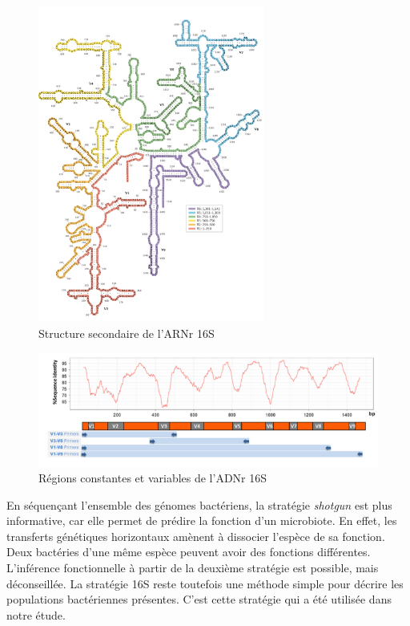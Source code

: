 \documentclass[12pt,a4paper]{article}
\begin{document}
\begin{figure}[ht]
\begin{center}
\includegraphics[scale=0.8]{img/ARN_16S.png}\hfill
\end{center}
\caption{Structure secondaire de l'ARNr 16S}
\label{ARN16S}
\end{figure}

\begin{figure}[ht]
\begin{center}
\includegraphics[scale=0.8]{img/ARN16S_variation.png}\hfill
\end{center}
\caption{Régions constantes et variables de l'ADNr 16S}
\label{ARN16SVariation}
\end{figure}

En séquençant l'ensemble des génomes bactériens, la stratégie \textit{shotgun} est plus informative, car elle permet de prédire la fonction d'un microbiote. En effet, les transferts génétiques horizontaux amènent à dissocier l'espèce de sa fonction. Deux bactéries d'une même espèce peuvent avoir des fonctions différentes. L'inférence fonctionnelle à partir de la deuxième stratégie est possible, mais déconseillée.
La stratégie 16S reste toutefois une méthode simple pour décrire les populations bactériennes présentes. C'est cette stratégie qui a été utilisée dans notre étude.
\end{document}
